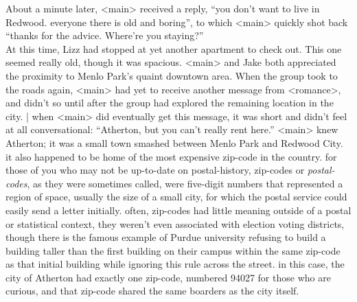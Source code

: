 \documentclass[12pt,openany]{memoir}
\begin{document}
About a minute later, <main> received a reply, ``you don't want to live in Redwood.  everyone there is old and boring'', to which <main> quickly shot back ``thanks for the advice.  Where're you staying?''
\\

At this time, Lizz had stopped at yet another apartment to check out.  This one seemed really old, though it was spacious.
<main> and Jake both appreciated the proximity to Menlo Park's quaint downtown area.
When the group took to the roads again, <main> had yet to receive another message from <romance>, and didn't so until after the group had explored the remaining location in the city. |  when <main> did eventually get this message, it was short and didn't feel at all conversational: ``Atherton, but you can't really rent here.''  <main> knew Atherton; it was a small town smashed between Menlo Park and Redwood City.
it also happened to be home of the most expensive zip-code in the country.
for those of you who may not be up-to-date on postal-history, zip-codes or \textit{postal-codes}, as they were sometimes called, were five-digit numbers that represented a region of space, usually the size of a small city, for which the postal service could easily send a letter initially.
often, zip-codes had little meaning outside of a postal or statistical context, they weren't even associated with election voting districts, though there is the famous example of Purdue university refusing to build a building taller than the first building on their campus within the same zip-code as that initial building while ignoring this rule across the street.
in this case, the city of Atherton had exactly one zip-code, numbered 94027 for those who are curious, and that zip-code shared the same boarders as the city itself.
\\
\end{document}
